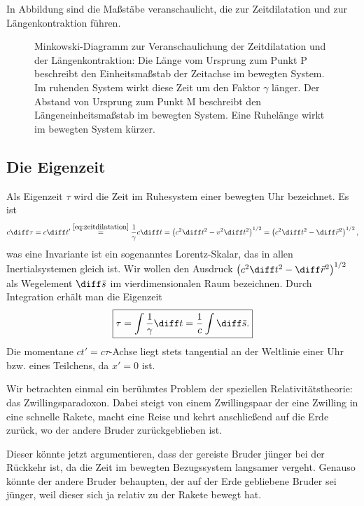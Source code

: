 In Abbildung  sind die Maßstäbe veranschaulicht, die zur Zeitdilatation und zur Längenkontraktion führen.

\begin{figure}[htp]
    \centering
    \tfigMinkowskiZeitdilatationLaengenkontraktion
    \caption{Minkowski-Diagramm zur Veranschaulichung der Zeitdilatation und der Längenkontraktion:
        Die Länge vom Ursprung zum Punkt P beschreibt den Einheitsmaßstab der Zeitachse im bewegten System.
        Im ruhenden System wirkt diese Zeit um den Faktor $\gamma$ länger.
        Der Abstand von Ursprung zum Punkt M beschreibt den Längeneinheitsmaßstab im bewegten System.
        Eine Ruhelänge wirkt im bewegten System kürzer. }
    \label{fig:minkowski_zeitdilatation_laengenkontraktion}
\end{figure}



\subsection{Die Eigenzeit}

Als Eigenzeit $\tau$ wird die Zeit im Ruhesystem einer bewegten Uhr bezeichnet. Es ist
\begin{align*}
    c\diff\tau=c\diff t' \overset{\eqref{eq:zeitdilatation}}{=} \frac{1}{\gamma} c\diff t =\left(c^2\diff t^2-v^2\diff t^2\right)^{1/2} = \left(c^2\diff t^2-\diff\vec r^2\right)^{1/2},
\end{align*}
was eine Invariante ist \textendash{} ein sogenanntes Lorentz-Skalar, das in allen Inertialsystemen gleich ist.
Wir wollen den Ausdruck $\left(c^2\diff t^2-\diff\vec r^2\right)^{1/2}$ als Wegelement $\diff\bar{s}$ im vierdimensionalen Raum bezeichnen.
Durch Integration erhält man die Eigenzeit
\begin{align*}
    \boxed{\tau=\int \frac{1}{\gamma}\diff t=\frac{1}{c}\int\diff\bar{s}.}
\end{align*}
Die momentane $ct'=c\tau$-Achse liegt stets tangential an der Weltlinie einer Uhr bzw. eines Teilchens, da $x'=0$ ist.

Wir betrachten einmal ein berühmtes Problem der speziellen Relativitätstheorie: das Zwillingsparadoxon.
Dabei steigt von einem Zwillingspaar der eine Zwilling in eine schnelle Rakete, macht eine Reise und kehrt anschließend auf die Erde zurück, wo der andere Bruder zurückgeblieben ist.

Dieser könnte jetzt argumentieren, dass der gereiste Bruder jünger bei der Rückkehr ist, da die Zeit im bewegten Bezugssystem langsamer vergeht.
Genauso könnte der andere Bruder behaupten, der auf der Erde gebliebene Bruder sei jünger, weil dieser sich ja relativ zu der Rakete bewegt hat.

